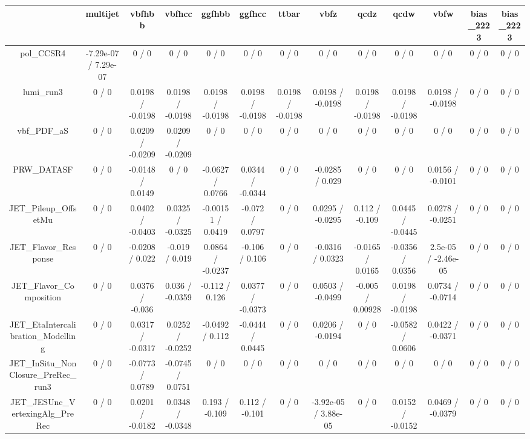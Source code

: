 \documentclass[10pt]{article}
\begin{document}
\begin{table}[htbp]
\begin{center}
\begin{tabular}{|c|c|c|c|c|c|c|c|c|c|c|c|c|}
\hline 
      & multijet      & vbfhbb      & vbfhcc      & ggfhbb      & ggfhcc      & ttbar      & vbfz      & qcdz      & qcdw      & vbfw      & bias_2223      & bias_2223 \\ 
\hline 
  pol_CCSR4 & -7.29e-07 / 7.29e-07 & 0 / 0 & 0 / 0 & 0 / 0 & 0 / 0 & 0 / 0 & 0 / 0 & 0 / 0 & 0 / 0 & 0 / 0 & 0 / 0 & 0 / 0 \\ 
  lumi_run3 & 0 / 0 & 0.0198 / -0.0198 & 0.0198 / -0.0198 & 0.0198 / -0.0198 & 0.0198 / -0.0198 & 0.0198 / -0.0198 & 0.0198 / -0.0198 & 0.0198 / -0.0198 & 0.0198 / -0.0198 & 0.0198 / -0.0198 & 0 / 0 & 0 / 0 \\ 
  vbf_PDF_aS & 0 / 0 & 0.0209 / -0.0209 & 0.0209 / -0.0209 & 0 / 0 & 0 / 0 & 0 / 0 & 0 / 0 & 0 / 0 & 0 / 0 & 0 / 0 & 0 / 0 & 0 / 0 \\ 
  PRW_DATASF & 0 / 0 & -0.0148 / 0.0149 & 0 / 0 & -0.0627 / 0.0766 & 0.0344 / -0.0344 & 0 / 0 & -0.0285 / 0.029 & 0 / 0 & 0 / 0 & 0.0156 / -0.0101 & 0 / 0 & 0 / 0 \\ 
  JET_Pileup_OffsetMu & 0 / 0 & 0.0402 / -0.0403 & 0.0325 / -0.0325 & -0.00151 / 0.0419 & -0.072 / 0.0797 & 0 / 0 & 0.0295 / -0.0295 & 0.112 / -0.109 & 0.0445 / -0.0445 & 0.0278 / -0.0251 & 0 / 0 & 0 / 0 \\ 
  JET_Flavor_Response & 0 / 0 & -0.0208 / 0.022 & -0.019 / 0.019 & 0.0864 / -0.0237 & -0.106 / 0.106 & 0 / 0 & -0.0316 / 0.0323 & -0.0165 / 0.0165 & -0.0356 / 0.0356 & 2.5e-05 / -2.46e-05 & 0 / 0 & 0 / 0 \\ 
  JET_Flavor_Composition & 0 / 0 & 0.0376 / -0.036 & 0.036 / -0.0359 & -0.112 / 0.126 & 0.0377 / -0.0373 & 0 / 0 & 0.0503 / -0.0499 & -0.005 / 0.00928 & 0.0198 / -0.0198 & 0.0734 / -0.0714 & 0 / 0 & 0 / 0 \\ 
  JET_EtaIntercalibration_Modelling & 0 / 0 & 0.0317 / -0.0317 & 0.0252 / -0.0252 & -0.0492 / 0.112 & -0.0444 / 0.0445 & 0 / 0 & 0.0206 / -0.0194 & 0 / 0 & -0.0582 / 0.0606 & 0.0422 / -0.0371 & 0 / 0 & 0 / 0 \\ 
  JET_InSitu_NonClosure_PreRec_run3 & 0 / 0 & -0.0773 / 0.0789 & -0.0745 / 0.0751 & 0 / 0 & 0 / 0 & 0 / 0 & 0 / 0 & 0 / 0 & 0 / 0 & 0 / 0 & 0 / 0 & 0 / 0 \\ 
  JET_JESUnc_VertexingAlg_PreRec & 0 / 0 & 0.0201 / -0.0182 & 0.0348 / -0.0348 & 0.193 / -0.109 & 0.112 / -0.101 & 0 / 0 & -3.92e-05 / 3.88e-05 & 0 / 0 & 0.0152 / -0.0152 & 0.0469 / -0.0379 & 0 / 0 & 0 / 0 \\ 

\end{tabular}
\end{center}
\end{table}
\end{document}
